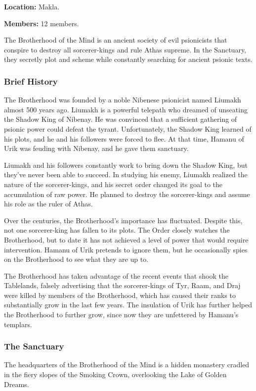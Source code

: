 \textbf{Location:} Makla.

\textbf{Members:} 12 members.

The Brotherhood of the Mind is an ancient society of evil psionicists that conspire to destroy all sorcerer-kings and rule Athas supreme. In the Sanctuary, they secretly plot and scheme while constantly searching for ancient psionic texts.

\subsubsection{Brief History}
The Brotherhood was founded by a noble Nibenese psionicist named Liumakh almost 500 years ago. Liumakh is a powerful telepath who dreamed of unseating the Shadow King of Nibenay. He was convinced that a sufficient gathering of psionic power could defeat the tyrant. Unfortunately, the Shadow King learned of his plots, and he and his followers were forced to flee. At that time, Hamanu of Urik was feuding with Nibenay, and he gave them sanctuary.

Liumakh and his followers constantly work to bring down the Shadow King, but they've never been able to succeed. In studying his enemy, Liumakh realized the nature of the sorcerer-kings, and his secret order changed its goal to the accumulation of raw power. He planned to destroy the sorcerer-kings and assume his role as the ruler of Athas.

Over the centuries, the Brotherhood's importance has fluctuated. Despite this, not one sorcerer-king has fallen to its plots. The Order closely watches the Brotherhood, but to date it has not achieved a level of power that would require intervention. Hamanu of Urik pretends to ignore them, but he occasionally spies on the Brotherhood to see what they are up to.

The Brotherhood has taken advantage of the recent events that shook the Tablelands, falsely advertising that the sorcerer-kings of Tyr, Raam, and Draj were killed by members of the Brotherhood, which has caused their ranks to substantially grow in the last few years. The insulation of Urik has further helped the Brotherhood to further grow, since now they are unfettered by Hamanu's templars.

\subsubsection{The Sanctuary}
The headquarters of the Brotherhood of the Mind is a hidden monastery cradled in the fiery slopes of the Smoking Crown, overlooking the Lake of Golden Dreams.


